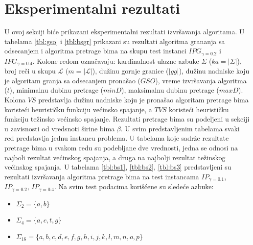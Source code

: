\documentclass[12pt,oneside]{memoir}
\begin{document}
\section{Eksperimentalni rezultati}
\label{sec:ekspRezultati}
U ovoj sekciji biće prikazani eksperimentalni rezultati izvršavanja algoritama.
U tabelama \ref{tbl:gso} i \ref{tbl:bsgr} prikazani su rezultati algoritma grananja sa odsecanjem
i algoritma pretrage bima
na skupu test instanci $IPG_{\gamma=0.2}$ i $IPG_{\gamma=0.4}$. 
Kolone redom označavaju: kardinalnost ulazne azbuke $\Sigma$ ($ka=|\Sigma|$),
broj reči u skupu $\mathcal{L}$ ($m=|\mathcal{L}|$), dužinu gornje granice ($|gg|$),
dužinu nadniske koju je algoritam granja sa odsecanjem pronašao ($GSO$),
vreme izvršavanja algoritma ($t$),
minimalnu dubinu pretrage ($minD$),
maksimalnu dubinu pretrage ($maxD$).
Kolona $VS$ predstavlja
dužinu nadniske koju je pronašao algoritam pretrage bima koristeći
heurističku funkciju većinsko spajanje, a $TVS$ koristeći
heurističku funkciju težinsko većinsko spajanje.
Rezultati pretrage bima su podeljeni u sekciji u zavisnosti od
vredsnoti širine bima $\beta$.
U svim predstavljenim tabelama svaki red predstavlja jednu instancu problema.
U tabelama koje sadrže rezultate pretrage bima u svakom redu su podebljane dve
vrednosti, jedna se odnosi na najboli rezultat većinskog spajanja, a druga na
najbolji rezultat težinskog većinskog spajanja.
U tabelama \ref{tbl:bs1}, \ref{tbl:bs2}, \ref{tbl:bs3} predstavljeni su rezultati
izvršavanja algoritma pretrage bima na test instancama
$IP_{\gamma=0.1}$, $IP_{\gamma=0.2}$, $IP_{\gamma=0.4}$.
Na svim test podacima korišćene su sledeće azbuke:
\begin{itemize}
  \item $\Sigma_{2}=\{a,b\}$
  \item $\Sigma_{4}=\{a,c,t,g\}$
  \item $\Sigma_{16}=\{a,b,c,d,e,f,g,h,i,j,k,l,m,n,o,p\}$
\end{itemize}
\end{document}
